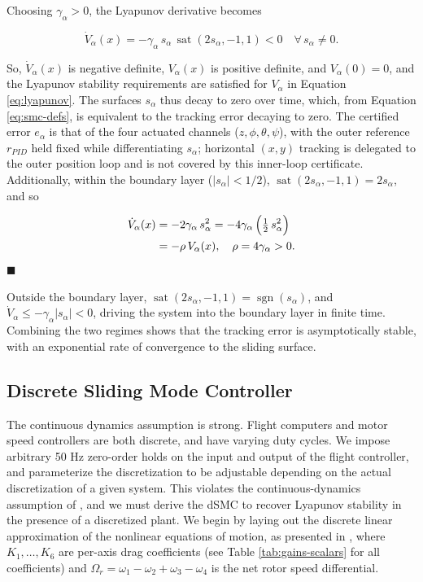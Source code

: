 \documentclass[conf]{new-aiaa}
\DeclareMathOperator{\sat}{sat}
\DeclareMathOperator{\sgn}{sgn}
\begin{document}
Choosing $\gamma_\alpha > 0$, the Lyapunov derivative becomes

\small
\begin{equation}
\label{eq:lyap-negdef}
\dot V_\alpha(x)
= -\gamma_\alpha\, s_\alpha\,
\sat(2s_\alpha,-1,1)
< 0
\quad \forall\, s_\alpha \neq 0.
\end{equation}
\normalsize

So, $\dot V_\alpha(x)$ is negative definite, $V_\alpha(x)$ is positive definite, and $V_\alpha(0)=0$, and the Lyapunov stability requirements are satisfied for $V_\alpha$ in Equation \ref{eq:lyapunov}. The surfaces $s_\alpha$ thus decay to zero over time, which, from Equation \ref{eq:smc-defs}, is equivalent to the tracking error decaying to zero. The certified error $e_\alpha$ is that of the four actuated channels ($z, \phi, \theta, \psi$), with the outer reference $r_{PID}$ held fixed while differentiating $s_\alpha$; horizontal $(x,y)$ tracking is delegated to the outer position loop and is not covered by this inner-loop certificate. Additionally, within the boundary layer ($|s_\alpha| < 1/2$), $\sat(2s_\alpha,-1,1) = 2s_\alpha$, and so

\small
\begin{align}
\dot V_\alpha(x) &= -2\gamma_\alpha\, s_\alpha^2
= -4\gamma_\alpha\,\Big(\tfrac{1}{2}\, s_\alpha^2\Big) \notag \\
&= -\rho\, V_\alpha(x), \quad \rho = 4\gamma_\alpha > 0.
\label{eq:lyap_exp_stab}
\end{align}
\normalsize
\hfill$\blacksquare$

Outside the boundary layer, $\sat(2s_\alpha,-1,1) = \sgn(s_\alpha)$, and $\dot V_\alpha \leq -\gamma_\alpha |s_\alpha| < 0$, driving the system into the boundary layer in finite time. Combining the two regimes shows that the tracking error is asymptotically stable, with an exponential rate of convergence to the sliding surface.

\subsection{Discrete Sliding Mode Controller}
The continuous dynamics assumption is strong. Flight computers and motor speed controllers are both discrete, and have varying duty cycles. We impose arbitrary 50 Hz zero-order holds on the input and output of the flight controller, and parameterize the discretization to be adjustable depending on the actual discretization of a given system. This violates the continuous-dynamics assumption of \cite{refs:Tahir2020}, and we must derive the dSMC to recover Lyapunov stability in the presence of a discretized plant. We begin by laying out the discrete linear approximation of the nonlinear equations of motion, as presented in \cite{refs:Xiong2016}, where $K_1, \dots, K_6$ are per-axis drag coefficients (see Table \ref{tab:gains-scalars} for all coefficients) and $\Omega_r = \omega_1 - \omega_2 + \omega_3 - \omega_4$ is the net rotor speed differential.
\end{document}
